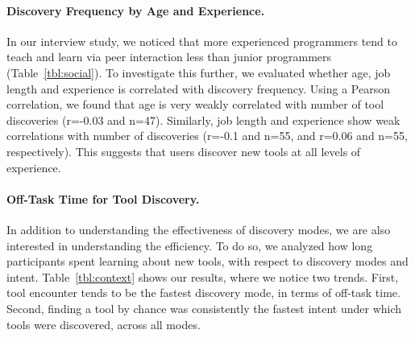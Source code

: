 \documentclass[smallextended]{svjour3}
\newcommand\contexts{modes\xspace}
\begin{document}
\paragraph{Discovery Frequency by Age and Experience.}

In our interview study, we noticed that more experienced programmers
tend to teach and learn via peer interaction less than junior programmers (Table~\ref{tbl:social}).
To investigate this further, we evaluated whether age, job length and experience is 
correlated with discovery frequency.
Using a Pearson correlation, we found that age is very weakly correlated with number of tool discoveries (r=-0.03 and n=47). 
Similarly, job length and experience show weak correlations with number of discoveries (r=-0.1 and n=55, and r=0.06 and n=55, respectively).
This suggests that users discover new tools at all levels of experience.

\paragraph{Off-Task Time for Tool Discovery.}

In addition to understanding the effectiveness of discovery \contexts,
we are also interested in understanding the efficiency.
To do so, we analyzed how long participants spent 
learning about new tools, with respect to 
discovery modes and intent.
Table~\ref{tbl:context} shows our results, where
we notice two trends.
First, tool encounter tends to be the fastest discovery mode,
in terms of off-task time.
Second, finding a tool by chance was consistently the fastest
intent under which tools were discovered, across all modes.
\end{document}
